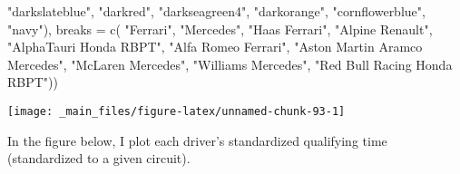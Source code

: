 \documentclass[
]{book}
\newenvironment{Shaded}{\begin{snugshade}}{\end{snugshade}}
\newcommand{\AttributeTok}[1]{\textcolor[rgb]{0.77,0.63,0.00}{#1}}
\newcommand{\FunctionTok}[1]{\textcolor[rgb]{0.00,0.00,0.00}{#1}}
\newcommand{\NormalTok}[1]{#1}
\newcommand{\StringTok}[1]{\textcolor[rgb]{0.31,0.60,0.02}{#1}}
\begin{document}
\begin{Shaded}
\begin{Highlighting}[]
                               \StringTok{"darkslateblue"}\NormalTok{, }
                                \StringTok{"darkred"}\NormalTok{,  }
                                \StringTok{"darkseagreen4"}\NormalTok{, }
                                \StringTok{"darkorange"}\NormalTok{, }
                                \StringTok{"cornflowerblue"}\NormalTok{,}
                               \StringTok{"navy"}\NormalTok{),}
                     \AttributeTok{breaks =} \FunctionTok{c}\NormalTok{( }\StringTok{"Ferrari"}\NormalTok{,}
                                 \StringTok{"Mercedes"}\NormalTok{,}
                                 \StringTok{"Haas Ferrari"}\NormalTok{,}
                                 \StringTok{"Alpine Renault"}\NormalTok{,}
                                 \StringTok{"AlphaTauri Honda RBPT"}\NormalTok{,}
                                 \StringTok{"Alfa Romeo Ferrari"}\NormalTok{, }
                                 \StringTok{"Aston Martin Aramco Mercedes"}\NormalTok{,}
                                 \StringTok{"McLaren Mercedes"}\NormalTok{,}
                                 \StringTok{"Williams Mercedes"}\NormalTok{,}
                                 \StringTok{"Red Bull Racing Honda RBPT"}\NormalTok{))}
\end{Highlighting}
\end{Shaded}

\begin{center}\texttt{[image: \_main\_files/figure-latex/unnamed-chunk-93-1]} \end{center}

In the figure below, I plot each driver's standardized qualifying time (standardized to a given circuit).
\end{document}
